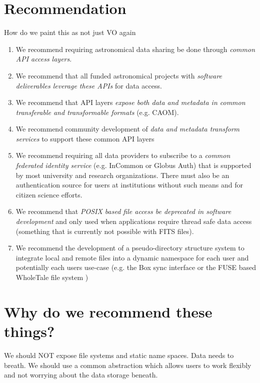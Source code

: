 \section{Recommendation }

How do we paint this as not just VO again

\begin{enumerate}
\item We recommend requiring astronomical data sharing be done through \emph{common API
access layers}.

\item We recommend that all funded astronomical projects with \emph{software deliverables
leverage these APIs} for data access.

\item We recommend that API layers \emph{expose both data and metadata in common
transferable and transformable formats} (e.g. CAOM).

\item We recommend community development of \emph{data and metadata transform services}
to support these common API layers

\item We recommend requiring all data providers to subscribe to a
\emph{common federated identity service} (e.g. InCommon or
Globus Auth) that is supported by most university and research organizations. There
must also be
an authentication source for users at institutions without such means and for
citizen science efforts.

\item We recommend that \emph{POSIX based file access be deprecated
in software development} and only used when applications require thread safe
data access (something that is currently not possible with FITS files).

\item We recommend the development of a pseudo-directory structure system to
integrate local and remote files into a dynamic namespace for each user and potentially
each users use-case (e.g. the Box sync interface or the FUSE based WholeTale file system
\citep{BRINCKMAN2019854})


\end{enumerate}

\section{Why do we recommend these things?}


We should NOT expose file systems and static name spaces.  Data needs to breath. We should use a common abstraction which allows users to work flexibly and not worrying about the data storage beneath.

